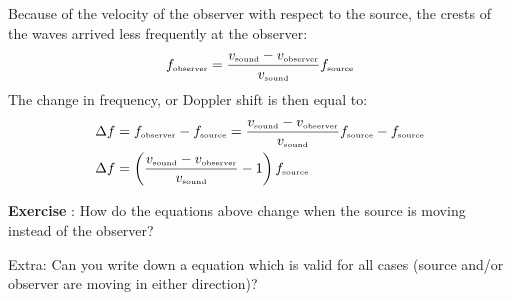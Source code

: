 Because of the velocity of the observer with respect to the source, the crests of the waves arrived less frequently at the observer:
\begin{equation}
f_{\mbox{\begin{tiny}observer\end{tiny}}} = \frac{v_{\mbox{\begin{tiny}sound\end{tiny}}} - v_{\mbox{\begin{tiny}observer\end{tiny}}}}{v_{\mbox{\begin{tiny}sound\end{tiny}}}} f_{\mbox{\begin{tiny}source\end{tiny}}} \label{eq:doppler_f_obs}
\end{equation}
The change in frequency, or Doppler shift is then equal to:
\begin{align}
\Delta f &= f_{\mbox{\begin{tiny}observer\end{tiny}}} - f_{\mbox{\begin{tiny}source\end{tiny}}}= \frac{v_{\mbox{\begin{tiny}sound\end{tiny}}} - v_{\mbox{\begin{tiny}observer\end{tiny}}}}{v_{\mbox{\begin{tiny}sound\end{tiny}}}} f_{\mbox{\begin{tiny}source\end{tiny}}} - f_{\mbox{\begin{tiny}source\end{tiny}}} \\
\Delta f &= \left( \frac{v_{\mbox{\begin{tiny}sound\end{tiny}}} - v_{\mbox{\begin{tiny}observer\end{tiny}}}}{v_{\mbox{\begin{tiny}sound\end{tiny}}}} -1 \right)  f_{\mbox{\begin{tiny}source\end{tiny}}}
 \label{eq:f_delta_away}
\end{align}

\begin{shaded}
\textbf{Exercise \theExercise {}} : How do the equations above change when the source is moving instead of the observer?

Extra: Can you write down a equation which is valid for all cases (source and/or observer are moving in either direction)? \end{shaded}


